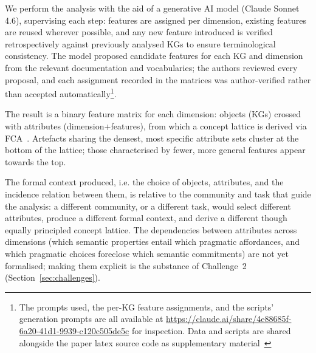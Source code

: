 \documentclass[runningheads]{llncs}
\newenvironment{onlyextended}{\ignorespaces}{\ignorespacesafterend}
\newenvironment{inboth}{}{}
\begin{document}
\begin{inboth}
We perform the analysis with the aid of a generative AI 
model (Claude Sonnet 4.6), supervising each step: features 
are assigned per dimension, existing 
features are reused wherever possible, and any new feature 
introduced is verified retrospectively against previously 
analysed KGs to ensure terminological consistency. 
The model proposed candidate features for each KG and dimension from the relevant documentation and vocabularies; the authors reviewed every proposal, and each assignment recorded in the matrices was author-verified rather than accepted automatically\footnote{The prompts used, the per-KG feature assignments, and the scripts' generation prompts are all available at \url{https://claude.ai/share/4e88685f-6a20-41d1-9939-c120c505de5c} for inspection. Data and scripts are shared alongside the paper latex source code as supplementary material~\cite{supplementary}}.

The result is a binary feature matrix for each dimension: 
objects (KGs) crossed with attributes (dimension+features), from which a concept lattice is derived via 
FCA~\cite{ganter1999formal}. 
Artefacts sharing the densest, most specific attribute sets cluster at the 
bottom of the lattice; those characterised by fewer, more 
general features appear towards the top.
\end{inboth}

\begin{onlyextended}
The formal context produced, i.e. the choice of objects, 
attributes, and the incidence relation between them, is 
relative to the community and task that guide the 
analysis: a different community, or a different task, 
would select different attributes, produce a different 
formal context, and derive a different though equally 
principled concept lattice. The dependencies between 
attributes across dimensions (which semantic properties 
entail which pragmatic affordances, and which pragmatic 
choices foreclose which semantic commitments) are not yet 
formalised; making them explicit is the substance of 
Challenge~2 (Section~\ref{sec:challenges}).
\end{onlyextended}
\end{document}
